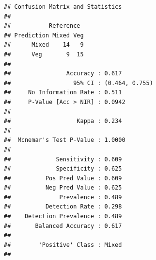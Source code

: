 \documentclass[
]{book}
\newenvironment{Shaded}{\begin{snugshade}}{\end{snugshade}}
\newcommand{\AttributeTok}[1]{\textcolor[rgb]{0.77,0.63,0.00}{#1}}
\newcommand{\CommentTok}[1]{\textcolor[rgb]{0.56,0.35,0.01}{\textit{#1}}}
\newcommand{\ControlFlowTok}[1]{\textcolor[rgb]{0.13,0.29,0.53}{\textbf{#1}}}
\newcommand{\DecValTok}[1]{\textcolor[rgb]{0.00,0.00,0.81}{#1}}
\newcommand{\FloatTok}[1]{\textcolor[rgb]{0.00,0.00,0.81}{#1}}
\newcommand{\FunctionTok}[1]{\textcolor[rgb]{0.00,0.00,0.00}{#1}}
\newcommand{\NormalTok}[1]{#1}
\newcommand{\OtherTok}[1]{\textcolor[rgb]{0.56,0.35,0.01}{#1}}
\newcommand{\SpecialCharTok}[1]{\textcolor[rgb]{0.00,0.00,0.00}{#1}}
\newcommand{\StringTok}[1]{\textcolor[rgb]{0.31,0.60,0.02}{#1}}
\begin{document}
\begin{Shaded}
\end{Shaded}

\begin{verbatim}
## Confusion Matrix and Statistics
## 
##           Reference
## Prediction Mixed Veg
##      Mixed    14   9
##      Veg       9  15
##                                         
##                Accuracy : 0.617         
##                  95% CI : (0.464, 0.755)
##     No Information Rate : 0.511         
##     P-Value [Acc > NIR] : 0.0942        
##                                         
##                   Kappa : 0.234         
##                                         
##  Mcnemar's Test P-Value : 1.0000        
##                                         
##             Sensitivity : 0.609         
##             Specificity : 0.625         
##          Pos Pred Value : 0.609         
##          Neg Pred Value : 0.625         
##              Prevalence : 0.489         
##          Detection Rate : 0.298         
##    Detection Prevalence : 0.489         
##       Balanced Accuracy : 0.617         
##                                         
##        'Positive' Class : Mixed         
## 
\end{verbatim}
\end{document}
